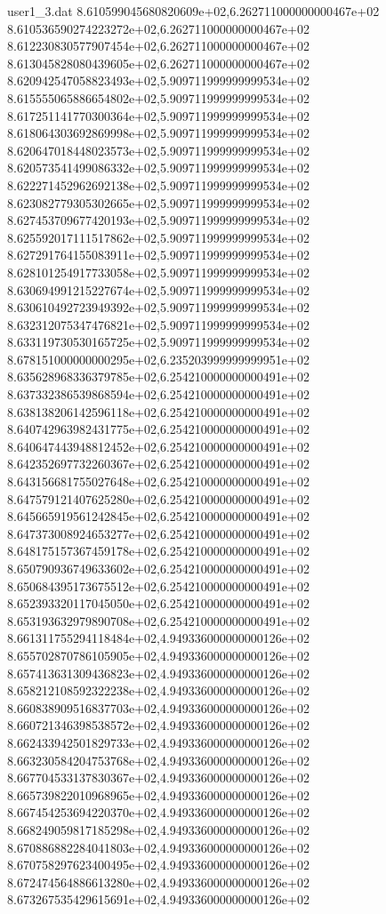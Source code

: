 \begin{filecontents}{user1_3.dat}
8.610599045680820609e+02,6.262711000000000467e+02
8.610536590274223272e+02,6.262711000000000467e+02
8.612230830577907454e+02,6.262711000000000467e+02
8.613045828080439605e+02,6.262711000000000467e+02
8.620942547058823493e+02,5.909711999999999534e+02
8.615555065886654802e+02,5.909711999999999534e+02
8.617251141770300364e+02,5.909711999999999534e+02
8.618064303692869998e+02,5.909711999999999534e+02
8.620647018448023573e+02,5.909711999999999534e+02
8.620573541499086332e+02,5.909711999999999534e+02
8.622271452962692138e+02,5.909711999999999534e+02
8.623082779305302665e+02,5.909711999999999534e+02
8.627453709677420193e+02,5.909711999999999534e+02
8.625592017111517862e+02,5.909711999999999534e+02
8.627291764155083911e+02,5.909711999999999534e+02
8.628101254917733058e+02,5.909711999999999534e+02
8.630694991215227674e+02,5.909711999999999534e+02
8.630610492723949392e+02,5.909711999999999534e+02
8.632312075347476821e+02,5.909711999999999534e+02
8.633119730530165725e+02,5.909711999999999534e+02
8.678151000000000295e+02,6.235203999999999951e+02
8.635628968336379785e+02,6.254210000000000491e+02
8.637332386539868594e+02,6.254210000000000491e+02
8.638138206142596118e+02,6.254210000000000491e+02
8.640742963982431775e+02,6.254210000000000491e+02
8.640647443948812452e+02,6.254210000000000491e+02
8.642352697732260367e+02,6.254210000000000491e+02
8.643156681755027648e+02,6.254210000000000491e+02
8.647579121407625280e+02,6.254210000000000491e+02
8.645665919561242845e+02,6.254210000000000491e+02
8.647373008924653277e+02,6.254210000000000491e+02
8.648175157367459178e+02,6.254210000000000491e+02
8.650790936749633602e+02,6.254210000000000491e+02
8.650684395173675512e+02,6.254210000000000491e+02
8.652393320117045050e+02,6.254210000000000491e+02
8.653193632979890708e+02,6.254210000000000491e+02
8.661311755294118484e+02,4.949336000000000126e+02
8.655702870786105905e+02,4.949336000000000126e+02
8.657413631309436823e+02,4.949336000000000126e+02
8.658212108592322238e+02,4.949336000000000126e+02
8.660838909516837703e+02,4.949336000000000126e+02
8.660721346398538572e+02,4.949336000000000126e+02
8.662433942501829733e+02,4.949336000000000126e+02
8.663230584204753768e+02,4.949336000000000126e+02
8.667704533137830367e+02,4.949336000000000126e+02
8.665739822010968965e+02,4.949336000000000126e+02
8.667454253694220370e+02,4.949336000000000126e+02
8.668249059817185298e+02,4.949336000000000126e+02
8.670886882284041803e+02,4.949336000000000126e+02
8.670758297623400495e+02,4.949336000000000126e+02
8.672474564886613280e+02,4.949336000000000126e+02
8.673267535429615691e+02,4.949336000000000126e+02

\end{filecontents}
